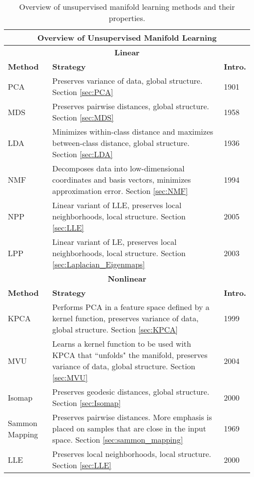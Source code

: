 \begin{longtable}{ |p{}|p{}|p{}| } 
	\caption{Overview of unsupervised manifold learning methods and their properties.}
	\label{tab:Manifold_Learning_Comparison_Table}\\
	\hline
	\multicolumn{3}{|c|}{\textbf{Overview of Unsupervised Manifold Learning}} \\
	\hline
	\multicolumn{3}{|c|}{\textbf{Linear}} \\
	\hline
	\textbf{Method} & \textbf{Strategy} & \textbf{Intro.}\\
	\hline
	PCA   & Preserves variance of data, global structure. Section \ref{sec:PCA} & 1901\\
	\hline
	MDS  & Preserves pairwise distances, global structure. Section \ref{sec:MDS}  & 1958\\
	\hline
	LDA  & Minimizes within-class distance and maximizes between-class distance, global structure. Section \ref{sec:LDA}  & 1936\\
	\hline
	NMF   & Decomposes data into low-dimensional coordinates and basis vectors, minimizes approximation error. Section \ref{sec:NMF} & 1994\\
	\hline
	NPP  & Linear variant of LLE, preserves local neighborhoods, local structure. Section \ref{sec:LLE}  & 2005\\
	\hline
	LPP  & Linear variant of LE, preserves local neighborhoods, local structure. Section \ref{sec:Laplacian_Eigenmaps}  & 2003\\
	\hline
	\multicolumn{3}{|c|}{\textbf{Nonlinear}} \\
	\hline
	\textbf{Method} & \textbf{Strategy} & \textbf{Intro.}\\
	\hline
	KPCA  & Performs PCA in a feature space defined by a kernel function, preserves variance of data, global structure.  Section \ref{sec:KPCA}  & 1999 \\
	\hline
	MVU  & Learns a kernel function to be used with KPCA that ``unfolds" the manifold, preserves variance of data, global structure. Section \ref{sec:MVU}  & 2004\\
	\hline
	Isomap  & Preserves geodesic distances, global structure.  Section \ref{sec:Isomap}  & 2000 \\
	\hline
	Sammon Mapping  & Preserves pairwise distances.  More emphasis is placed on samples that are close in the input space.  Section \ref{sec:sammon_mapping} & 1969 \\
	\hline
	LLE  & Preserves local neighborhoods, local structure. Section \ref{sec:LLE}  & 2000 \\

\end{longtable}
